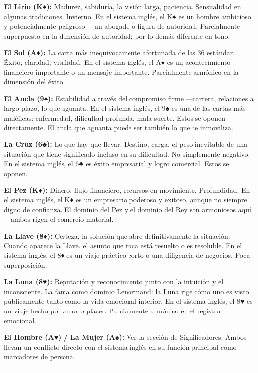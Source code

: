 \textbf{El Lirio (K♠):} Madurez, sabiduría, la visión larga, paciencia. Sensualidad en algunas tradiciones. Invierno. En el sistema inglés, el K♠ es un hombre ambicioso y potencialmente peligroso ---un abogado o figura de autoridad. Parcialmente superpuesto en la dimensión de autoridad; por lo demás diferente en tono.

\textbf{El Sol (A♦):} La carta más inequívocamente afortunada de las 36 estándar. Éxito, claridad, vitalidad. En el sistema inglés, el A♦ es un acontecimiento financiero importante o un mensaje importante. Parcialmente armónico en la dimensión del éxito.

\textbf{El Ancla (9♠):} Estabilidad a través del compromiso firme ---carrera, relaciones a largo plazo, lo que aguanta. En el sistema inglés, el 9♠ es una de las cartas más maléficas: enfermedad, dificultad profunda, mala suerte. Estos se oponen directamente. El ancla que aguanta puede ser también lo que te inmoviliza.

\textbf{La Cruz (6♣):} Lo que hay que llevar. Destino, carga, el peso inevitable de una situación que tiene significado incluso en su dificultad. No simplemente negativo. En el sistema inglés, el 6♣ es éxito empresarial y logro comercial. Estos se oponen.

\textbf{El Pez (K♦):} Dinero, flujo financiero, recursos en movimiento. Profundidad. En el sistema inglés, el K♦ es un empresario poderoso y exitoso, aunque no siempre digno de confianza. El dominio del Pez y el dominio del Rey son armoniosos aquí ---ambos rigen el comercio material.

\textbf{La Llave (8♦):} Certeza, la solución que abre definitivamente la situación. Cuando aparece la Llave, el asunto que toca está resuelto o es resoluble. En el sistema inglés, el 8♦ es un viaje práctico corto o una diligencia de negocios. Poca superposición.

\textbf{La Luna (8♥):} Reputación y reconocimiento junto con la intuición y el inconsciente. La fama como dominio Lenormand: la Luna rige cómo uno es visto públicamente tanto como la vida emocional interior. En el sistema inglés, el 8♥ es un viaje hecho por amor o placer. Parcialmente armónico en el registro emocional.

\textbf{El Hombre (A♥) / La Mujer (A♠):} Ver la sección de Significadores. Ambos llevan un conflicto directo con el sistema inglés en su función principal como marcadores de persona.

\begin{center}\rule{0.5\linewidth}{0.5pt}\end{center}

